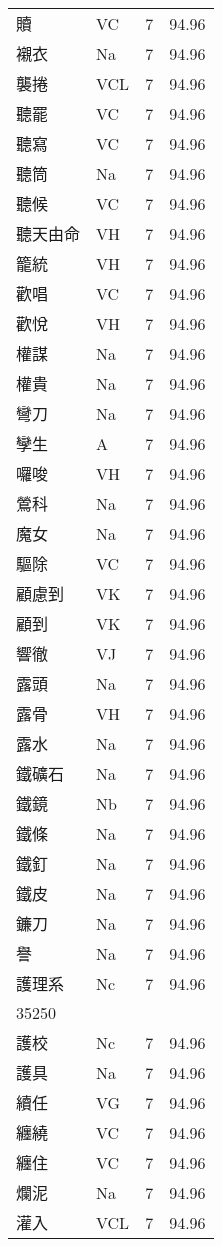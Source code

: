 \documentclass[twocolumn]{book}
\begin{document}
\begin{supertabular}{llrr}
贖 & VC & 7 &  94.96\\
襯衣 & Na & 7 &  94.96\\
襲捲 & VCL & 7 &  94.96\\
聽罷 & VC & 7 &  94.96\\
聽寫 & VC & 7 &  94.96\\
聽筒 & Na & 7 &  94.96\\
聽候 & VC & 7 &  94.96\\
聽天由命 & VH & 7 &  94.96\\
籠統 & VH & 7 &  94.96\\
歡唱 & VC & 7 &  94.96\\
歡悅 & VH & 7 &  94.96\\
權謀 & Na & 7 &  94.96\\
權貴 & Na & 7 &  94.96\\
彎刀 & Na & 7 &  94.96\\
孿生 & A & 7 &  94.96\\
囉唆 & VH & 7 &  94.96\\
鶯科 & Na & 7 &  94.96\\
魔女 & Na & 7 &  94.96\\
驅除 & VC & 7 &  94.96\\
顧慮到 & VK & 7 &  94.96\\
顧到 & VK & 7 &  94.96\\
響徹 & VJ & 7 &  94.96\\
露頭 & Na & 7 &  94.96\\
露骨 & VH & 7 &  94.96\\
露水 & Na & 7 &  94.96\\
鐵礦石 & Na & 7 &  94.96\\
鐵鏡 & Nb & 7 &  94.96\\
鐵條 & Na & 7 &  94.96\\
鐵釘 & Na & 7 &  94.96\\
鐵皮 & Na & 7 &  94.96\\
鐮刀 & Na & 7 &  94.96\\
譽 & Na & 7 &  94.96\\
護理系 & Nc & 7 &  94.96\\
35250\\
護校 & Nc & 7 &  94.96\\
護具 & Na & 7 &  94.96\\
續任 & VG & 7 &  94.96\\
纏繞 & VC & 7 &  94.96\\
纏住 & VC & 7 &  94.96\\
爛泥 & Na & 7 &  94.96\\
灌入 & VCL & 7 &  94.96\\

\end{supertabular}
\end{document}
